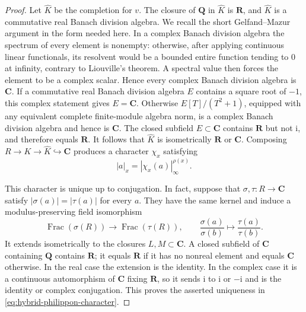 \begin{proof}
Let \(\widehat K\) be the completion for \(v\).  The closure of
\(\mathbf Q\) in \(\widehat K\) is \(\mathbf R\), and \(\widehat K\) is a
commutative real Banach division algebra.  We recall the short
Gelfand--Mazur argument in the form needed here.  In a complex Banach
division algebra the spectrum of every element is nonempty: otherwise,
after applying continuous linear functionals, its resolvent would be a
bounded entire function tending to \(0\) at infinity, contrary to
Liouville's theorem.  A spectral value then forces the element to be a
complex scalar.  Hence every complex Banach division algebra is
\(\mathbf C\).  If a commutative real Banach division algebra \(E\)
contains a square root of \(-1\), this complex statement gives
\(E=\mathbf C\).  Otherwise \(E[T]/(T^2+1)\), equipped with any equivalent
complete finite-module algebra norm, is a complex Banach division algebra
and hence is \(\mathbf C\).  The closed subfield \(E\subset\mathbf C\)
contains \(\mathbf R\) but not \(\mathrm i\), and therefore equals
\(\mathbf R\).  It follows that \(\widehat K\) is isometrically
\(\mathbf R\) or \(\mathbf C\).  Composing
\(R\to K\to\widehat K\hookrightarrow\mathbf C\) produces a character
\(\chi_x\) satisfying
\begin{equation}\label{eq:hybrid-philippon-character}
 |a|_x=|\chi_x(a)|_\infty^{\rho(x)}.
\end{equation}

This character is unique up to conjugation.  In fact, suppose that
\(\sigma,\tau\colon R\to\mathbf C\) satisfy
\(|\sigma(a)|=|\tau(a)|\) for every \(a\).  They have the same kernel and
induce a modulus-preserving field isomorphism
\[
 \operatorname{Frac}(\sigma(R))\longrightarrow
 \operatorname{Frac}(\tau(R)),
 \qquad
 \frac{\sigma(a)}{\sigma(b)}\longmapsto
 \frac{\tau(a)}{\tau(b)}.
\]
It extends isometrically to the closures \(L,M\subset\mathbf C\).  A closed
subfield of \(\mathbf C\) containing \(\mathbf Q\) contains \(\mathbf R\);
it equals \(\mathbf R\) if it has no nonreal element and equals
\(\mathbf C\) otherwise.  In the real case the extension is the identity.
In the complex case it is a continuous automorphism of \(\mathbf C\)
fixing \(\mathbf R\), so it sends \(\mathrm i\) to \(\mathrm i\) or
\(-\mathrm i\) and is the identity or complex conjugation.  This proves the
asserted uniqueness in \eqref{eq:hybrid-philippon-character}.


\end{proof}
